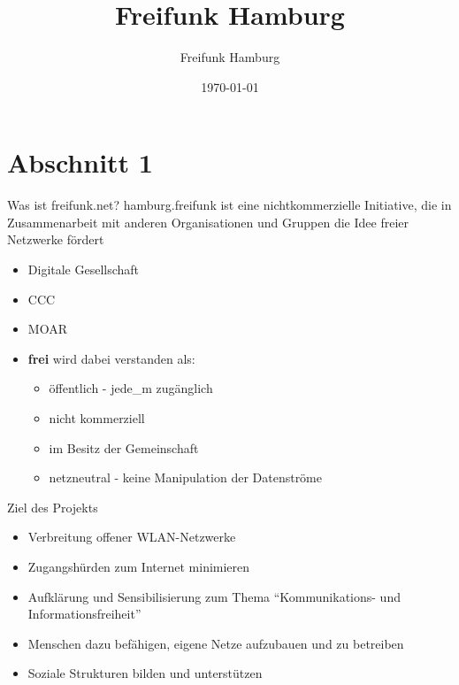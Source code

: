 \documentclass[aspectratio=43]{beamer}
\title{Freifunk Hamburg}
\author{Freifunk Hamburg}
\date{\today}
\begin{document}
\maketitle
\frame{\tableofcontents[currentsection]}

\section{Abschnitt 1}
\begin{frame}{Was ist freifunk.net?}
  hamburg.freifunk ist eine nichtkommerzielle Initiative, die in Zusammenarbeit mit anderen Organisationen und Gruppen die Idee freier Netzwerke fördert
  \begin{itemize}
	\item Digitale Gesellschaft
	\item CCC
	\item MOAR %
  \end{itemize}
\end{frame}

\begin{frame}
\begin{itemize}
	\item \textbf{frei} wird dabei verstanden als:
	\begin{itemize}
		\item öffentlich - jede\_m zugänglich
		\item nicht kommerziell
		\item im Besitz der Gemeinschaft
		\item netzneutral - keine Manipulation der Datenströme
	\end{itemize}
  \end{itemize}
\end{frame}

\begin{frame}{Ziel des Projekts}
	\begin{itemize}
		\item Verbreitung offener WLAN-Netzwerke
		\item Zugangshürden zum Internet minimieren
		\item Aufklärung und Sensibilisierung zum Thema ``Kommunikations- und Informationsfreiheit''
		\item Menschen dazu befähigen, eigene Netze aufzubauen und zu betreiben
		\item Soziale Strukturen bilden und unterstützen %
	\end{itemize}
\end{frame}
\end{document}
